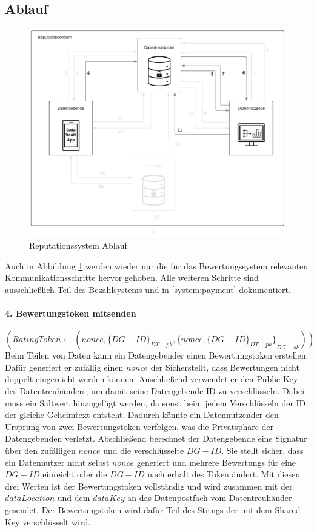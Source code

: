 \documentclass[
	fontsize=12pt,
	headings=small,
	parskip=half,           %
	bibliography=totoc,
	numbers=noenddot,       %
	open=any,               %
]{scrreprt}
\begin{document}
\subsection{Ablauf}
\begin{figure}[H]
    \centering
    \includegraphics[width=0.9\linewidth]{ReputationDiagramm.pdf}
    \caption{Reputationssystem Ablauf}
    \label{fig:reputation}
\end{figure}

Auch in Abbildung \ref{fig:reputation} werden wieder nur die für das Bewertungssystem relevanten Kommunikationsschritte hervor gehoben. Alle weiteren Schritte sind ausschließlich Teil des Bezahlsystems und in \ref{system:payment} dokumentiert.

\paragraph{4. Bewertungstoken mitsenden}$(RatingToken \leftarrow (nonce, {\{DG-ID\}}_{DT-pk},{\{nonce, {\{DG-ID\}}_{DT-pk}\}}_{DG-sk}))$\\
Beim Teilen von Daten kann ein Datengebender einen Bewertungstoken erstellen. Dafür generiert er zufällig einen $nonce$ der Sicherstellt, dass Bewertungen nicht doppelt eingereicht werden können. Anschließend verwendet er den Public-Key des Datentreuhänders, um damit seine Datengebende ID zu verschlüsseln. Dabei muss ein Saltwert hinzugefügt werden, da sonst beim jedem Verschlüsseln der ID der gleiche Geheimtext entsteht. Dadurch könnte ein Datennutzender den Ursprung von zwei Bewertungstoken verfolgen, was die Privatsphäre der Datengebenden verletzt. Abschließend berechnet der Datengebende eine Signatur über den zufälligen $nonce$ und die verschlüsselte $DG-ID$. Sie stellt sicher, dass ein Datennutzer nicht selbst $nonce$ generiert und mehrere Bewertungs für eine $DG-ID$ einreicht oder die $DG-ID$ nach erhalt des Token ändert. Mit diesen drei Werten ist der Bewertungstoken vollständig und wird zusammen mit der $dataLocation$ und dem $dataKey$ an das Datenpostfach vom Datentreuhänder gesendet. Der Bewertungstoken wird dafür Teil des Strings der mit dem Shared-Key verschlüsselt wird.
\end{document}
